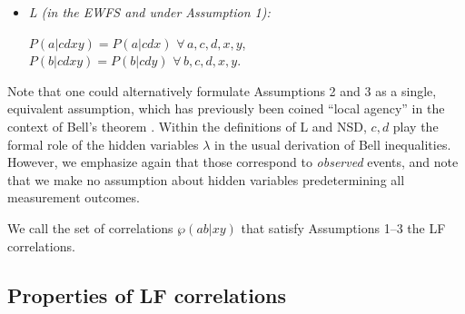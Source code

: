 \documentclass[aps,prx,twocolumn,superscriptaddress]{revtex4-1}
\theoremstyle{plain}
\begin{document}
\begin{itemize}
\item \textit{{L} (in the EWFS and under Assumption 1):}

$P(a|cdxy)=P(a|cdx)$ $\forall \, a,c,d,x,y$,\\ 
$P(b|cdxy)=P(b|cdy)$ $\forall \, b,c,d,x,y$.
\end{itemize}


Note that one could alternatively formulate Assumptions 2 and 3 as a single, equivalent assumption, which has previously been coined ``local agency'' in the context of Bell's theorem \cite{Causarum}. 
Within the definitions of L and  NSD, $c,d$ play the formal role of the hidden variables $\lambda$ in the usual derivation of Bell inequalities. However, we emphasize again that those correspond to \emph{observed} events, and note that we make no assumption about hidden variables predetermining all measurement outcomes. 


We call the set of correlations $\wp(ab|xy)$ that satisfy Assumptions 1--3 the LF correlations.


\subsection{Properties of LF correlations}
\end{document}
